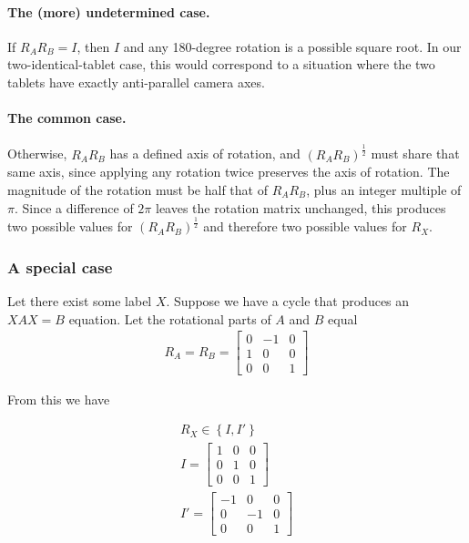 \paragraph{The (more) undetermined case.}
If $R_A R_B = I$, then $I$ and any 180-degree rotation is a possible
square root. In our two-identical-tablet case, this would correspond to a situation 
where the two tablets have exactly anti-parallel camera axes.

\paragraph{The common case.}
Otherwise, $R_A R_B$ has a defined axis of rotation, 
and $\left( R_A R_B \right)^\frac{1}{2}$ must share that same axis, 
since applying any rotation twice preserves the axis of 
rotation. 
The magnitude of the rotation must be half that of $R_A R_B$,
plus an integer multiple of $\pi$. Since a difference of $2 \pi$ leaves the rotation matrix unchanged,
this produces two possible values for $\left( R_A R_B \right)^\frac{1}{2}$ and therefore two possible 
values for $R_X$.

\subsubsection{A special case}

\label{sec:special}
Let there exist some label $X$. Suppose we have a cycle that produces an $XAX = B$
equation. Let the rotational parts of $A$ and $B$ equal
\begin{align}
	R_A = R_B = \left[\begin{array}{ccc}
		0 &  -1 & 0 \\
		1 & 0 & 0 \\
		0 & 0 & 1
	\end{array} \right]
\end{align}

From this we have

\begin{align}
	R_X \in \left\{
		I,
		I'
	\right\} \\
	I = \left[\begin{array}{ccc}
			1 &  0 & 0 \\
			0 & 1 & 0 \\
			0 & 0 & 1
		\end{array} \right] \\
	I' = \left[\begin{array}{ccc}
			-1 &  0 & 0 \\
			0 & -1 & 0 \\
			0 & 0 & 1
		\end{array} \right]
\end{align}

